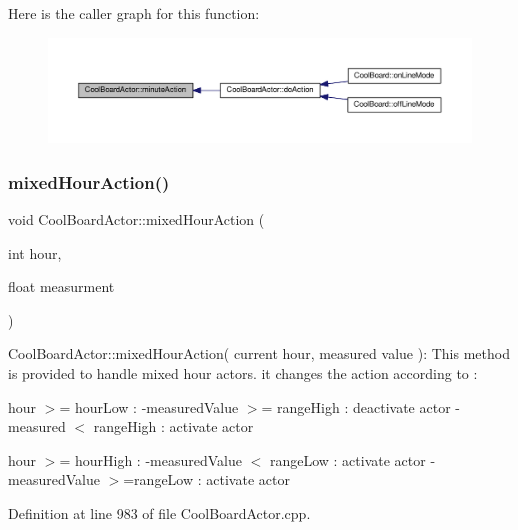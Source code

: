 Here is the caller graph for this function\+:\nopagebreak
\begin{figure}[H]
\begin{center}
\leavevmode
\includegraphics[width=350pt]{dc/d69/class_cool_board_actor_af000944ce0b9abb9c6ee4b8fe839fb36_icgraph}
\end{center}
\end{figure}
\mbox{\label{class_cool_board_actor_a6d93a24502c56ced2ef7675c913a276b}} 
\subsubsection{\texorpdfstring{mixed\+Hour\+Action()}{mixedHourAction()}}
{\footnotesize\ttfamily void Cool\+Board\+Actor\+::mixed\+Hour\+Action (\begin{DoxyParamCaption}\item[{int}]{hour,  }\item[{float}]{measurment }\end{DoxyParamCaption})}

Cool\+Board\+Actor\+::mixed\+Hour\+Action( current hour, measured value )\+: This method is provided to handle mixed hour actors. it changes the action according to \+:

hour $>$= hour\+Low \+: -\/measured\+Value $>$= range\+High \+: deactivate actor -\/measured $<$ range\+High \+: activate actor

hour $>$= hour\+High \+: -\/measured\+Value $<$ range\+Low \+: activate actor -\/measured\+Value $>$=range\+Low \+: activate actor 

Definition at line 983 of file Cool\+Board\+Actor.\+cpp.


